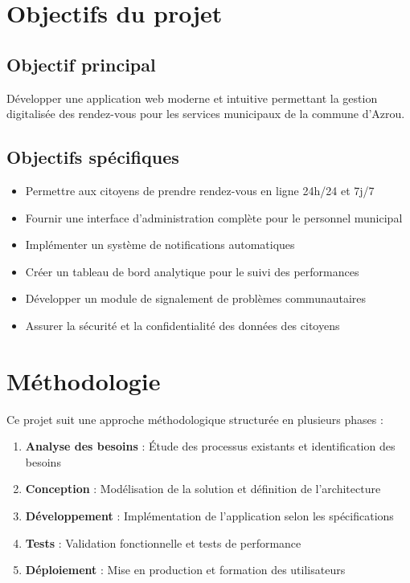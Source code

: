 \section{Objectifs du projet}

\subsection{Objectif principal}

Développer une application web moderne et intuitive permettant la gestion digitalisée des rendez-vous pour les services municipaux de la commune d'Azrou.

\subsection{Objectifs spécifiques}

\begin{itemize}
    \item Permettre aux citoyens de prendre rendez-vous en ligne 24h/24 et 7j/7
    \item Fournir une interface d'administration complète pour le personnel municipal
    \item Implémenter un système de notifications automatiques
    \item Créer un tableau de bord analytique pour le suivi des performances
    \item Développer un module de signalement de problèmes communautaires
    \item Assurer la sécurité et la confidentialité des données des citoyens
\end{itemize}

\section{Méthodologie}

Ce projet suit une approche méthodologique structurée en plusieurs phases :

\begin{enumerate}
    \item \textbf{Analyse des besoins} : Étude des processus existants et identification des besoins
    \item \textbf{Conception} : Modélisation de la solution et définition de l'architecture
    \item \textbf{Développement} : Implémentation de l'application selon les spécifications
    \item \textbf{Tests} : Validation fonctionnelle et tests de performance
    \item \textbf{Déploiement} : Mise en production et formation des utilisateurs
\end{enumerate}

